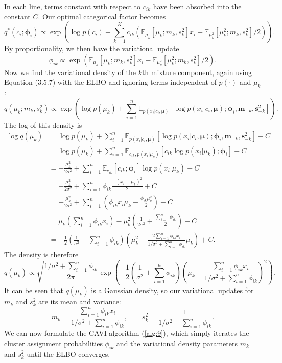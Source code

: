 \documentclass[honours,12pt, twoside]{unswthesis}
\numberwithin{equation}{section}
\theoremstyle{definition}
\begin{document}
In each line, terms constant with respect to $c_{ik}$ have been absorbed into the constant $C$. Our optimal categorical factor becomes
\[q^*(c_i;\bm{\phi}_i)\propto \exp \left(\log p(c_i)+\sum_{k=1}^Kc_{ik}\left(\mathbb{E}_{\mu_k}[\mu_k;m_k,s^2_k]x_i-\mathbb{E}_{\mu^2_k}[\mu^2_k;m_k,s^2_k]/2\right)\right).\]
By proportionality, we then have the variational update
\[\phi_{ik}\propto \exp\left(\mathbb{E}_{\mu_k}[\mu_k;m_k,s^2_k]x_i-\mathbb{E}_{\mu^2_k}[\mu^2_k;m_k,s^2_k]/2\right).\]
Now we find the variational density of the $k$th mixture component, again using Equation (3.5.7) with the ELBO and ignoring terms independent of $p(\cdot)$ and $\mu_k$:
\[q(\mu_k;m_k,s^2_k)\propto \exp \left(\log p(\mu_k)+\sum^n_{i=1}\mathbb{E}_{p(x_i|c_i,\bm{\mu})}[\log p(x_i|c_i,\bm{\mu});\bm{\phi}_i, \bm{m}_{-k},\bm{s}^2_{-k}]\right).\]
The log of this density is
\begin{align*}
\log q(\mu_k)&=\log p(\mu_k)+\sum_{i=1}^n \mathbb{E}_{p(x_i|c_i,\bm{\mu})}[\log p(x_i|c_i,\bm{\mu});\bm{\phi}_i,\bm{m}_{-k},\bm{s}^2_{-k}]+C\\
&= \log p(\mu_k)+\sum_{i=1}^n\mathbb{E}_{c_{ik},p(x_i|\mu_k)}[c_{ik}\log p(x_i|\mu_k);\bm{\phi}_i]+C\\
&= -\frac{\mu^2_k}{2\sigma^2}+\sum^n_{i=1}\mathbb{E}_{c_{ik}}[c_{ik};\bm{\phi}_i]\log p(x_i|\mu_k)+C\\
&= -\frac{\mu^2_k}{2\sigma^2}+\sum^n_{i=1}\phi_{ik}\frac{-(x_i-\mu_k)^2}{2}+C\\
&= -\frac{\mu^2_k}{2\sigma^2}+\sum^n_{i=1} \left(\phi_{ik}x_i\mu_k-\frac{\phi_{ik}\mu^2_k}{2}\right)+C\\
&= \mu_k\left(\sum^n_{i=1}\phi_{ik}x_i\right)-\mu_k^2\left(\frac{1}{2\sigma^2}+\frac{\sum^n_{i=1}\phi_{ik}}{2}\right)+C\\
&= -\frac{1}{2}\left(\frac{1}{\sigma^2}+\sum^n_{i=1}\phi_{ik}\right)\left(\mu_k^2-\frac{2\sum^n_{i=1}\phi_{ik}x_i}{1/\sigma^2+\sum^n_{i=1}\phi_{ik}}\mu_k\right)+C.
\end{align*}
The density is therefore
\[q(\mu_k)\propto \sqrt{\frac{1/\sigma^2+\sum^n_{i=1}\phi_{ik}}{2\pi}}\exp\left(-\frac{1}{2}\left(\frac{1}{\sigma^2}+\sum^n_{i=1}\phi_{ik}\right) \left(\mu_k-\frac{\sum^n_{i=1}\phi_{ik}x_i}{1/\sigma^2+\sum^n_{i=1}\phi_{ik}}\right)^2\right).\]
It can be seen that $q(\mu_k)$ is a Gaussian density, so our variational updates for $m_k$ and $s^2_k$ are its mean and variance:
\[m_k=\frac{\sum^n_{i=1}\phi_{ik}x_i}{1/\sigma^2+\sum^n_{i=1}\phi_{ik}}, \qquad s^2_k=\frac{1}{1/\sigma^2+\sum^n_{i=1}\phi_{ik}}.\]
We can now formulate the CAVI algorithm (\autoref{alg:9}), which simply iterates the cluster assignment probabilities $\phi_{ik}$ and the variational density parameters $m_k$ and $s^2_k$ until the ELBO converges.
\end{document}
